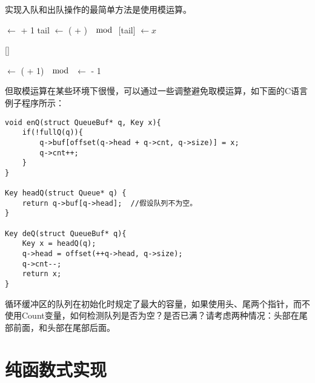 \documentclass[UTF8]{article}
\begin{document}
实现入队和出队操作的最简单方法是使用模运算。

\begin{algorithmic}
    \State {} $\gets$  + 1
    \State tail $\gets $ ( + ) $\mod$ 
    \State {}[tail] $\gets x$
  \EndIf
\EndFunction
\end{algorithmic}

\begin{algorithmic}
    \State \Return {}[]
  \EndIf
\EndFunction
\end{algorithmic}

\begin{algorithmic}
    \State {} $\gets $ ( + 1) $\mod$ 
    \State {} $\gets$  - 1
  \EndIf
\EndFunction
\end{algorithmic}

但取模运算在某些环境下很慢，可以通过一些调整避免取模运算，如下面的C语言例子程序所示：

\begin{lstlisting}
void enQ(struct QueueBuf* q, Key x){
    if(!fullQ(q)){
        q->buf[offset(q->head + q->cnt, q->size)] = x;
        q->cnt++;
    }
}

Key headQ(struct Queue* q) {
    return q->buf[q->head];  //假设队列不为空。
}

Key deQ(struct QueueBuf* q){
    Key x = headQ(q);
    q->head = offset(++q->head, q->size);
    q->cnt--;
    return x;
}
\end{lstlisting}

\begin{Exercise}
循环缓冲区的队列在初始化时规定了最大的容量，如果使用头、尾两个指针，而不使用Count变量，如何检测队列是否为空？是否已满？请考虑两种情况：头部在尾部前面，和头部在尾部后面。
\end{Exercise}

\section{纯函数式实现}
\end{document}
